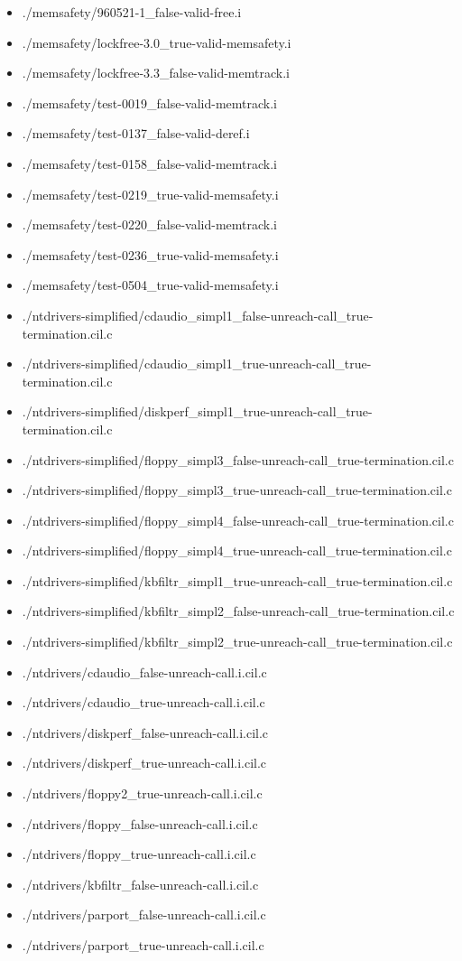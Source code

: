 \documentclass[envcountsame]{llncs}
\begin{document}
\begin{itemize}
\item ./memsafety/960521-1\_false-valid-free.i
\item ./memsafety/lockfree-3.0\_true-valid-memsafety.i
\item ./memsafety/lockfree-3.3\_false-valid-memtrack.i
\item ./memsafety/test-0019\_false-valid-memtrack.i
\item ./memsafety/test-0137\_false-valid-deref.i
\item ./memsafety/test-0158\_false-valid-memtrack.i
\item ./memsafety/test-0219\_true-valid-memsafety.i
\item ./memsafety/test-0220\_false-valid-memtrack.i
\item ./memsafety/test-0236\_true-valid-memsafety.i
\item ./memsafety/test-0504\_true-valid-memsafety.i


\item ./ntdrivers-simplified/cdaudio\_simpl1\_false-unreach-call\_true-termination.cil.c
\item ./ntdrivers-simplified/cdaudio\_simpl1\_true-unreach-call\_true-termination.cil.c
\item ./ntdrivers-simplified/diskperf\_simpl1\_true-unreach-call\_true-termination.cil.c
\item ./ntdrivers-simplified/floppy\_simpl3\_false-unreach-call\_true-termination.cil.c
\item ./ntdrivers-simplified/floppy\_simpl3\_true-unreach-call\_true-termination.cil.c
\item ./ntdrivers-simplified/floppy\_simpl4\_false-unreach-call\_true-termination.cil.c
\item ./ntdrivers-simplified/floppy\_simpl4\_true-unreach-call\_true-termination.cil.c
\item ./ntdrivers-simplified/kbfiltr\_simpl1\_true-unreach-call\_true-termination.cil.c
\item ./ntdrivers-simplified/kbfiltr\_simpl2\_false-unreach-call\_true-termination.cil.c
\item ./ntdrivers-simplified/kbfiltr\_simpl2\_true-unreach-call\_true-termination.cil.c


\item ./ntdrivers/cdaudio\_false-unreach-call.i.cil.c
\item ./ntdrivers/cdaudio\_true-unreach-call.i.cil.c
\item ./ntdrivers/diskperf\_false-unreach-call.i.cil.c
\item ./ntdrivers/diskperf\_true-unreach-call.i.cil.c
\item ./ntdrivers/floppy2\_true-unreach-call.i.cil.c
\item ./ntdrivers/floppy\_false-unreach-call.i.cil.c
\item ./ntdrivers/floppy\_true-unreach-call.i.cil.c
\item ./ntdrivers/kbfiltr\_false-unreach-call.i.cil.c
\item ./ntdrivers/parport\_false-unreach-call.i.cil.c
\item ./ntdrivers/parport\_true-unreach-call.i.cil.c



\end{itemize}
\end{document}
